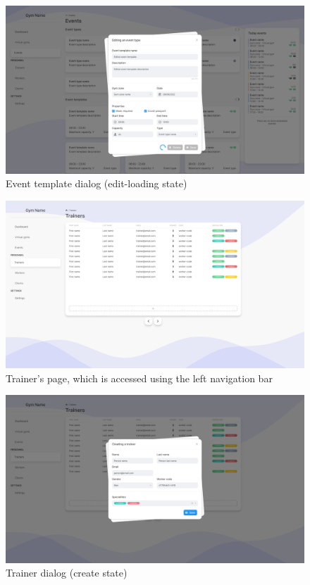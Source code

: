 \documentclass[a4paper, 12pt, oneside]{book}
\begin{document}
\begin{figure}[H]
	\centering
	\includegraphics[width=\textwidth]{assets/ui/EventTemplateEditLoading.png}
	\caption{Event template dialog (edit-loading state)}
\end{figure}
\begin{figure}[H]
	\centering
	\includegraphics[width=\textwidth]{assets/ui/Trainers.png}
	\caption{Trainer's page, which is accessed using the left navigation bar}
\end{figure}
\begin{figure}[H]
	\centering
	\includegraphics[width=\textwidth]{assets/ui/TrainerCreate.png}
	\caption{Trainer dialog (create state)}
\end{figure}
\end{document}
